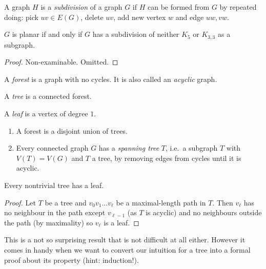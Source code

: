 \documentclass[a4paper]{article}
\begin{document}
\begin{definition}[subdivision]
  A graph \(H\) is a \emph{subdivision} of a graph \(G\) if \(H\) can be formed from \(G\) by repeated doing: pick \(uv \in E(G)\), delete \(uv\), add new vertex \(w\) and edge \(uw, vw\).
\end{definition}

\begin{theorem}[Kuratowski]
  \(G\) is planar if and only if \(G\) has a subdivision of neither \(K_5\) or \(K_{3, 3}\) as a subgraph.
\end{theorem}

\begin{proof}
  Non-examinable. Omitted.
\end{proof}

\begin{definition}
  A \emph{forest} is a graph with no cycles. It is also called an \emph{acyclic} graph.

  A \emph{tree} is a connected forest.

  A \emph{leaf} is a vertex of degree \(1\).
\end{definition}

\begin{remark}\leavevmode
  \begin{enumerate}
  \item A forest is a disjoint union of trees.
  \item Every connected graph  \(G\) has a \emph{spanning tree} \(T\), i.e.\ a subgraph \(T\) with \(V(T) = V(G)\) and \(T\) a tree, by removing edges from cycles until it is acyclic.
  \end{enumerate}
\end{remark}

\begin{proposition}
  Every nontrivial tree has a leaf.
\end{proposition}

\begin{proof}
  Let \(T\) be a tree and \(v_0v_1 \dots v_\ell\) be a maximal-length path in \(T\). Then \(v_\ell\) has no neighbour in the path except \(v_{\ell - 1}\) (as \(T\) is acyclic) and no neighbours outside the path (by maximality) so \(v_\ell\) is a leaf.
\end{proof}

This is a not so surprising result that is not difficult at all either. However it comes in handy when we want to convert our intuition for a tree into a formal proof about its property (hint: induction!).
\end{document}

